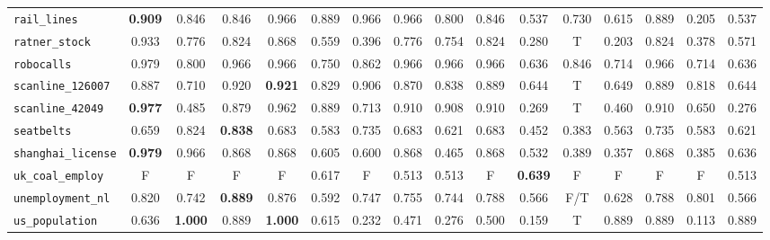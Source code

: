 \begin{table*}[h!]
\begin{adjustbox}{width=\textwidth}
\begin{tabular}{l|c|cccccccccccccc}
    \verb+rail_lines+ & \cellcolor{orange!06}\textbf{0.909} & 0.846 & 0.846 & 0.966 & 0.889 & 0.966 & {0.966} & 0.800 & 0.846 & 0.537 & 0.730 & 0.615 & 0.889 & 0.205 & 0.537\\
    
    \verb+ratner_stock+ & \cellcolor{cyan!07}0.933 & 0.776 & 0.824 & 0.868 & 0.559 & 0.396 & 0.776 & 0.754 & 0.824 & 0.280 & T & 0.203 & 0.824 & 0.378 & 0.571\\
    
    \verb+robocalls+ & \cellcolor{cyan!01}0.979 & 0.800 & 0.966 & 0.966 & 0.750 & 0.862 & 0.966 & 0.966 & 0.966 & 0.636 & 0.846 & 0.714 & 0.966 & 0.714 & 0.636\\
    
    \verb+scanline_126007+ & \cellcolor{orange!04}0.887 & 0.710 & 0.920 & \textbf{0.921} & 0.829 & 0.906 & 0.870 & 0.838 & 0.889 & 0.644 & T & 0.649 & 0.889 & 0.818 & 0.644\\
    
    \verb+scanline_42049+ & \cellcolor{cyan!01}\textbf{0.977} & 0.485 & 0.879 & 0.962 & 0.889 & 0.713 & 0.910 & 0.908 & 0.910 & 0.269 & T & 0.460 & 0.910 & 0.650 & 0.276\\
    
    \verb+seatbelts+ & \cellcolor{orange!20}0.659 & 0.824 & \textbf{0.838} & 0.683 & 0.583 & 0.735 & 0.683 & 0.621 & 0.683 & 0.452 & 0.383 & 0.563 & 0.735 & 0.583 & 0.621\\
    
    \verb+shanghai_license+ & \cellcolor{cyan!01}\textbf{0.979} & 0.966 & 0.868 & 0.868 & 0.605 & 0.600 & 0.868 & 0.465 & 0.868 & 0.532 & 0.389 & 0.357 & 0.868 & 0.385 & 0.636\\
    
    \cellcolor{gray!100}\verb+uk_coal_employ+ & \cellcolor{gray!100}F & \cellcolor{gray!100}F & \cellcolor{gray!100}F & \cellcolor{gray!100}F & \cellcolor{gray!100}0.617 & \cellcolor{gray!100}F & \cellcolor{gray!100}0.513 & \cellcolor{gray!100}0.513 & \cellcolor{gray!100}F & \cellcolor{gray!100}\textbf{0.639} & \cellcolor{gray!100}F & \cellcolor{gray!100}F & \cellcolor{gray!100}F & \cellcolor{gray!100}F & \cellcolor{gray!100}0.513\\
    
    \verb+unemployment_nl+ & \cellcolor{orange!07}0.820 & 0.742 & \textbf{0.889} & 0.876 & 0.592 & 0.747 & 0.755 & 0.744 & 0.788 & 0.566 & F/T & 0.628 & 0.788 & 0.801 & 0.566\\
    
    \verb+us_population+ & \cellcolor{orange!40}0.636 & \textbf{1.000} & 0.889 & \textbf{1.000} & 0.615 & 0.232 & 0.471 & 0.276 & 0.500 & 0.159 & T & 0.889 & 0.889 & 0.113 & 0.889\\
    

\end{tabular}
\end{adjustbox}
\end{table*}
